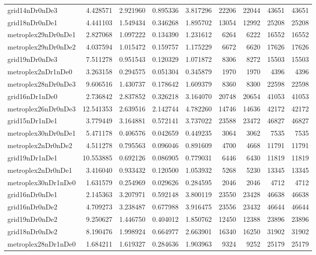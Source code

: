 \begin{longtable}{|l|r|r|r|r|r|r|r|r|}
grid14nDr0nDe3 & 4.428571 & 2.921960 & 0.895336 & 3.817296 & 22206 & 22044 & 43651 & 43651 \\
grid18nDr0nDe1 & 4.441103 & 1.549434 & 0.346268 & 1.895702 & 13054 & 12992 & 25208 & 25208 \\
metroplex29nDr0nDe1 & 2.827068 & 1.097222 & 0.134390 & 1.231612 & 6264 & 6222 & 16552 & 16552 \\
metroplex29nDr0nDe2 & 4.037594 & 1.015472 & 0.159757 & 1.175229 & 6672 & 6620 & 17626 & 17626 \\
grid19nDr0nDe3 & 7.511278 & 0.951543 & 0.120329 & 1.071872 & 8306 & 8272 & 15503 & 15503 \\
metroplex2nDr1nDe0 & 3.263158 & 0.294575 & 0.051304 & 0.345879 & 1970 & 1970 & 4396 & 4396 \\
metroplex28nDr0nDe3 & 9.606516 & 1.430737 & 0.178642 & 1.609379 & 8360 & 8300 & 22598 & 22598 \\
grid16nDr1nDe0 & 2.736842 & 2.837852 & 0.326218 & 3.164070 & 20748 & 20654 & 41053 & 41053 \\
metroplex26nDr0nDe3 & 12.541353 & 2.639516 & 2.142744 & 4.782260 & 14746 & 14636 & 42172 & 42172 \\
grid15nDr1nDe1 & 3.779449 & 3.164881 & 0.572141 & 3.737022 & 23588 & 23472 & 46827 & 46827 \\
metroplex30nDr0nDe1 & 5.471178 & 0.406576 & 0.042659 & 0.449235 & 3064 & 3062 & 7535 & 7535 \\
metroplex2nDr0nDe2 & 4.511278 & 0.795563 & 0.096046 & 0.891609 & 4700 & 4668 & 11791 & 11791 \\
grid19nDr1nDe1 & 10.553885 & 0.692126 & 0.086905 & 0.779031 & 6446 & 6430 & 11819 & 11819 \\
metroplex2nDr0nDe1 & 3.416040 & 0.933432 & 0.120500 & 1.053932 & 5268 & 5230 & 13345 & 13345 \\
metroplex30nDr1nDe0 & 1.631579 & 0.254969 & 0.029626 & 0.284595 & 2046 & 2046 & 4712 & 4712 \\
grid16nDr0nDe1 & 2.145363 & 3.207971 & 0.592148 & 3.800119 & 23550 & 23428 & 46638 & 46638 \\
grid16nDr0nDe2 & 4.709273 & 3.238487 & 0.677988 & 3.916475 & 23556 & 23432 & 46644 & 46644 \\
grid19nDr0nDe2 & 9.250627 & 1.446750 & 0.404012 & 1.850762 & 12450 & 12388 & 23896 & 23896 \\
grid18nDr0nDe2 & 8.190476 & 1.998924 & 0.664977 & 2.663901 & 16340 & 16250 & 31902 & 31902 \\
metroplex28nDr1nDe0 & 1.684211 & 1.619327 & 0.284636 & 1.903963 & 9324 & 9252 & 25179 & 25179 \\

\end{longtable}
